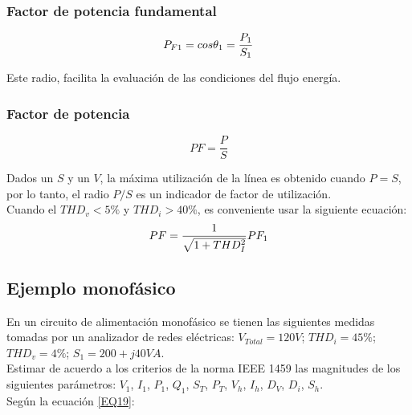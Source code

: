 \subsubsection{Factor de potencia fundamental}

\begin{equation}
P_{F1}=cos \theta_{1} = \frac{P_{1}}{S_{1}}\\
\end{equation}

Este radio, facilita la evaluación de las condiciones del flujo energía.\cite{A30}\\

\subsubsection{Factor de potencia}

\begin{equation}\label{EQ33}
PF=\frac{P}{S}
\end{equation}

Dados un $S$ y un $V$, la máxima utilización de la línea es obtenido cuando $P=S$, por lo tanto, el radio $P/S$ es un indicador de factor de utilización.\cite{A30}\\

Cuando el $THD_{v}<5\%$ y $THD_{i}>40\%$, es conveniente usar la siguiente ecuación:\\

\begin{equation}\label{EQ34}
PF=\frac{1}{\sqrt{1+THD^2_{I}}}PF_{1}\\
\end{equation}

\subsection{Ejemplo monofásico}

En un circuito de alimentación monofásico se tienen las siguientes medidas tomadas por un analizador de redes eléctricas: $V_{Total}=120 V$;  $THD_{i}= 45\%$; $THD_{v}= 4\%$; $S_{1}= 200 + j40 VA$.\\

Estimar de acuerdo a los criterios de la norma IEEE 1459 las magnitudes de los siguientes parámetros: $V_{1}$, $I_{1}$, $P_{1}$, $Q_{1}$, $S_{T}$, $P_{T}$, $V_{h}$, $I_{h}$, $D_{V}$, $D_{i}$, $S_{h}$.\\

Según la ecuación \ref{EQ19}:\\

